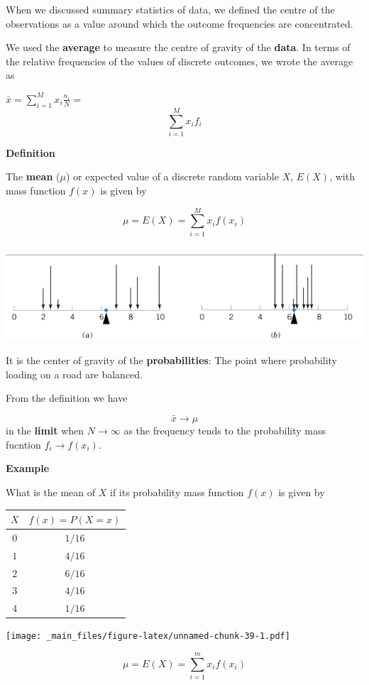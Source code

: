 \documentclass[
]{book}
\begin{document}
When we discussed summary statistics of data, we defined the centre of the observations as a value around which the outcome frequencies are concentrated.

We used the \textbf{average} to measure the centre of gravity of the \textbf{data}. In terms of the relative frequencies of the values of discrete outcomes, we wrote the average as

\(\bar{x}= \sum_{i=1}^M x_i \frac{n_i}{N}=\) \[\sum_{i=1}^M x_i f_i\]

\textbf{Definition}

The \textbf{mean} (\(\mu\)) or expected value of a discrete random variable \(X\), \(E(X)\), with mass function \(f(x)\) is given by

\[ \mu = E(X)= \sum_{i=1}^M x_i f(x_i) \]

\includegraphics{./figures/mu.png}

It is the center of gravity of the \textbf{probabilities}: The point where probability loading on a road are balanced.

From the definition we have

\[\bar{x} \rightarrow \mu\] in the \textbf{limit} when
\(N \rightarrow \infty\) as the frequency tends to the probability mass fucntion \(f_i \rightarrow f(x_i)\).

\textbf{Example}

What is the mean of \(X\) if its probability mass function \(f(x)\) is given by

\begin{longtable}[]{@{}cc@{}}
\toprule
\(X\) & \(f(x)=P(X=x)\) \\
\midrule
\endhead
\(0\) & \(1/16\) \\
\(1\) & \(4/16\) \\
\(2\) & \(6/16\) \\
\(3\) & \(4/16\) \\
\(4\) & \(1/16\) \\
\bottomrule
\end{longtable}

\texttt{[image: \_main\_files/figure-latex/unnamed-chunk-39-1.pdf]}

\[ \mu =E(X)=\sum_{i=1}^m x_i f(x_i) \]
\end{document}
